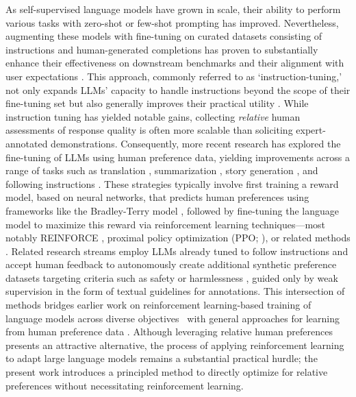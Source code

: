 As self-supervised language models have grown in scale, their ability to perform various tasks with zero-shot \citep{radford2019language} or few-shot prompting \citep{gpt3,megatron,chowdhery2022palm} has improved. Nevertheless, augmenting these models with fine-tuning on curated datasets consisting of instructions and human-generated completions has proven to substantially enhance their effectiveness on downstream benchmarks and their alignment with user expectations \citep{mishra-etal-2022-cross,sanh2022multitask,chung2022scaling,thoppilan2022lamda}. This approach, commonly referred to as `instruction-tuning,’ not only expands LLMs' capacity to handle instructions beyond the scope of their fine-tuning set but also generally improves their practical utility \citep{chung2022scaling}. While instruction tuning has yielded notable gains, collecting \textit{relative} human assessments of response quality is often more scalable than soliciting expert-annotated demonstrations. Consequently, more recent research has explored the fine-tuning of LLMs using human preference data, yielding improvements across a range of tasks such as translation \citep{kreutzer-etal-2018-reliability}, summarization \citep{stiennon2022learning,ziegler2020finetuning}, story generation \citep{ziegler2020finetuning}, and following instructions \citep{ouyang2022training,ramamurthy2023is}. These strategies typically involve first training a reward model, based on neural networks, that predicts human preferences using frameworks like the Bradley-Terry model \citep{bradley1952rankanalysis}, followed by fine-tuning the language model to maximize this reward via reinforcement learning techniques—most notably REINFORCE \citep{williams1992reinforce}, proximal policy optimization (PPO; \cite{schulman2017proximal}), or related methods \citep{ramamurthy2023is}. Related research streams employ LLMs already tuned to follow instructions and accept human feedback to autonomously create additional synthetic preference datasets targeting criteria such as safety or harmlessness \citep{bai2022constitutional}, guided only by weak supervision in the form of textual guidelines for annotations. This intersection of methods bridges earlier work on reinforcement learning-based training of language models across diverse objectives~\citep{Ranzato2015SequenceLT,paulus2018a,wu2018learning} with general approaches for learning from human preference data \citep{christiano2017deep,kupcsik2018learning}. Although leveraging relative human preferences presents an attractive alternative, the process of applying reinforcement learning to adapt large language models remains a substantial practical hurdle; the present work introduces a principled method to directly optimize for relative preferences without necessitating reinforcement learning.

